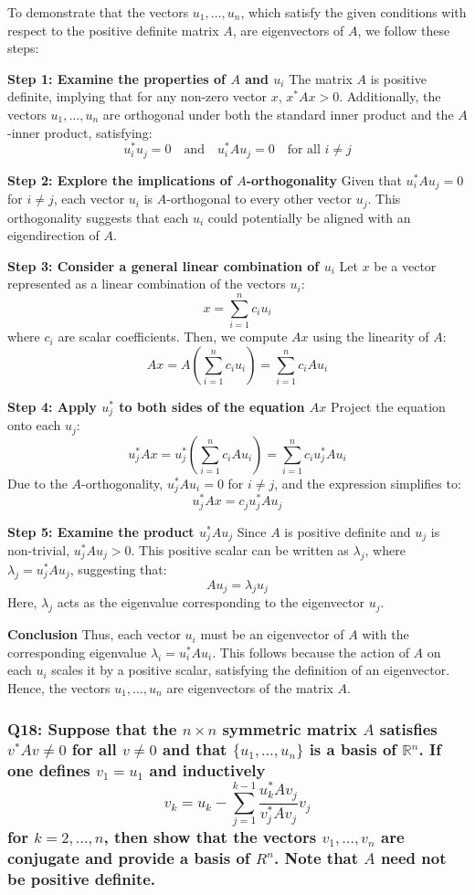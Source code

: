\documentclass{article}
\begin{document}
To demonstrate that the vectors \(u_1, \ldots, u_n\), which satisfy the given conditions with respect to the positive definite matrix \(A\), are eigenvectors of \(A\), we follow these steps:

\textbf{Step 1: Examine the properties of \(A\) and \(u_i\)}
The matrix \(A\) is positive definite, implying that for any non-zero vector \(x\), \(x^* Ax > 0\). Additionally, the vectors \(u_1, \ldots, u_n\) are orthogonal under both the standard inner product and the \(A\)-inner product, satisfying:
\[ u_i^* u_j = 0 \quad \text{and} \quad u_i^* A u_j = 0 \quad \text{for all } i \neq j \]

\textbf{Step 2: Explore the implications of \(A\)-orthogonality}
Given that \(u_i^* A u_j = 0\) for \(i \neq j\), each vector \(u_i\) is \(A\)-orthogonal to every other vector \(u_j\). This orthogonality suggests that each \(u_i\) could potentially be aligned with an eigendirection of \(A\).

\textbf{Step 3: Consider a general linear combination of \(u_i\)}
Let \(x\) be a vector represented as a linear combination of the vectors \(u_i\):
\[ x = \sum_{i=1}^n c_i u_i \]
where \(c_i\) are scalar coefficients. Then, we compute \(Ax\) using the linearity of \(A\):
\[ Ax = A\left(\sum_{i=1}^n c_i u_i\right) = \sum_{i=1}^n c_i Au_i \]

\textbf{Step 4: Apply \(u_j^*\) to both sides of the equation \(Ax\)}
Project the equation onto each \(u_j\):
\[ u_j^* Ax = u_j^* \left(\sum_{i=1}^n c_i Au_i\right) = \sum_{i=1}^n c_i u_j^* Au_i \]
Due to the \(A\)-orthogonality, \(u_j^* Au_i = 0\) for \(i \neq j\), and the expression simplifies to:
\[ u_j^* Ax = c_j u_j^* Au_j \]

\textbf{Step 5: Examine the product \(u_j^* Au_j\)}
Since \(A\) is positive definite and \(u_j\) is non-trivial, \(u_j^* Au_j > 0\). This positive scalar can be written as \(\lambda_j\), where \(\lambda_j = u_j^* Au_j\), suggesting that:
\[ Au_j = \lambda_j u_j \]
Here, \(\lambda_j\) acts as the eigenvalue corresponding to the eigenvector \(u_j\).

\textbf{Conclusion}
Thus, each vector \(u_i\) must be an eigenvector of \(A\) with the corresponding eigenvalue \(\lambda_i = u_i^* Au_i\). This follows because the action of \(A\) on each \(u_i\) scales it by a positive scalar, satisfying the definition of an eigenvector. Hence, the vectors \(u_1, \ldots, u_n\) are eigenvectors of the matrix \(A\).

\subsubsection*{Q18: Suppose that the \(n \times n\) symmetric matrix \(A\) satisfies \(v^* A v \neq 0\) for all \(v \neq 0\) and that \(\{u_1, \ldots, u_n\}\) is a basis of \(\mathbb{R}^n\). If one defines \(v_1 = u_1\) and inductively
\[ v_k = u_k - \sum_{j=1}^{k-1} \frac{u_k^* A v_j}{v_j^* A v_j} v_j \]
for \(k = 2, \ldots, n\), then show that the vectors \(v_1, \ldots, v_n\) are conjugate and provide a basis of \({R}^n\). Note that \(A\) need not be positive definite.}
\end{document}
